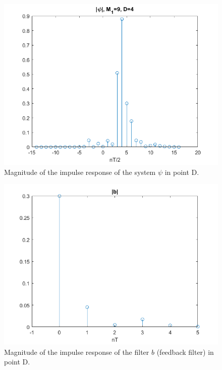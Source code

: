 \documentclass[a4paper,11.5pt]{article}
\begin{document}
\begin{figure}[ht]
	\begin{center}   
		\includegraphics[width=\textwidth]{figs/D_psi.png} 
		\caption{Magnitude of the impulse response of the system $\psi$ in point D.}
		\label{fig:D_psi}
	\end{center}
\end{figure}

\begin{figure}[ht]
	\begin{center}   
		\includegraphics[width=\textwidth]{figs/D_b.png} 
		\caption{Magnitude of the impulse response of the filter $b$ (feedback filter) in point D.}
		\label{fig:D_b}
	\end{center}
\end{figure}
\end{document}
